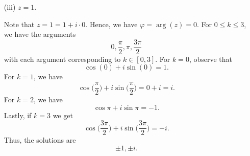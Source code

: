 \documentclass[a4paper]{article}
\begin{document}
\begin{enumerate}
            \item[(iii)] \( z = 1  \).
                \begin{solution}
                Note that \( z = 1 = 1 + i \cdot 0  \). Hence, we have \( \varphi = \arg(z) = 0 \). For \( 0 \leq k \leq 3  \), we have the arguments
                \[  0 , \frac{ \pi }{ 2 },  \pi, \frac{ 3 \pi  }{  2  }   \]
                with each argument corresponding to \( k \in [0,3]  \). For \( k = 0  \), observe that 
                \[  \cos(0) + i \sin (0) = 1.  \]
                For \( k = 1  \), we have 
                \[ \cos \Big(  \frac{ \pi }{ 2 }  \Big) + i \sin \Big(  \frac{ \pi }{ 2 }  \Big) = 0 + i = i.   \]
                For \( k = 2  \), we have
                \[  \cos \pi + i \sin \pi = -1. \]
                Lastly, if \( k = 3  \) we get  
                \[ \cos \Big(  \frac{ 3 \pi  }{ 2 }  \Big) + i \sin \Big(  \frac{ 3 \pi }{ 2 }  \Big) = - i.   \] 
                Thus, the solutions are  
                \[  \pm 1, \pm i. \]




\end{solution}
\end{enumerate}
\end{document}
